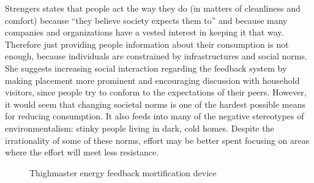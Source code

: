 Strengers states that people act the way they do (in matters of cleanliness and comfort) because ``they believe society expects them to'' and because many companies and organizations have a vested interest in keeping it that way. Therefore just providing people information about their consumption is not enough, because individuals are constrained by infrastructures and social norms. She suggests increasing social interaction regarding the feedback system by making placement more prominent and encouraging discussion with household visitors, since people try to conform to the expectations of their peers.
However, it would seem that changing societal norms is one of the hardest possible means for reducing consumption. It also feeds into many of the negative stereotypes of environmentalism: stinky people living in dark, cold homes. Despite the irrationality of some of these norms, effort may be better spent focusing on areas where the effort will meet less resistance.

\begin{figure}[htbp]
	\begin{center}
		\caption{Thighmaster energy feedback mortification device}
		\label{fig:thighmaster}
 	\end{center}
\end{figure}

